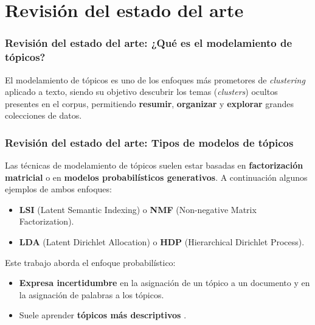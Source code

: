 \documentclass[
	spanish, %
	aspectratio=43, %
	hyperref={pdfencoding=auto,psdextra},
	xcolor={dvipsnames,table,usenames},
]{beamer}
\begin{document}
\section{Revisión del estado del arte}

\begin{frame}[t]
\frametitle{Revisión del estado del arte: ¿Qué es el modelamiento de tópicos?}
  El modelamiento de tópicos es uno de los enfoques más prometores de \textit{clustering} aplicado a texto, siendo su objetivo descubrir los temas (\textit{clusters}) ocultos presentes en el corpus, permitiendo \textbf{resumir}, \textbf{organizar} y \textbf{explorar} grandes colecciones de datos.


\end{frame}

\begin{frame}[t]
\frametitle{Revisión del estado del arte: Tipos de modelos de tópicos}
Las técnicas de modelamiento de tópicos suelen estar basadas en \textbf{factorización matricial} o en \textbf{modelos probabilísticos generativos}. 
\newline\newline
A continuación algunos ejemplos de ambos enfoques:

\begin{itemize}
  \item \textbf{LSI} (Latent Semantic Indexing) \cite{dumais2004latent} o \textbf{NMF} (Non-negative Matrix Factorization)\cite{xu2003document}. 
  \item \textbf{LDA} (Latent Dirichlet Allocation)\cite{blei2003latent} o \textbf{HDP} (Hierarchical Dirichlet Process)\cite{teh2005sharing}. 
\end{itemize} 

Este trabajo aborda el enfoque probabilístico: 
\begin{itemize}
  \item \textbf{Expresa incertidumbre} en la asignación de un tópico a un documento y en la asignación de palabras a los tópicos.%
  \item Suele aprender \textbf{tópicos más descriptivos} \cite{stevens2012exploring}.%
\end{itemize}

\end{frame}
\end{document}
